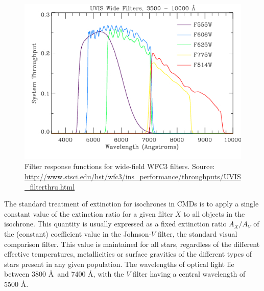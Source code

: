 \documentclass[12pt, a4paper]{report}
\begin{document}
\begin{figure}[h]
\begin{center}
\includegraphics[width=1.0\textwidth]{UVIS_Wide2.jpg}
\caption{Filter response functions for wide-field WFC3 filters. Source: \protect\url{http://www.stsci.edu/hst/wfc3/ins_performance/throughputs/UVIS_filterthru.html}}
\label{WFC3_response_funcs2}
\end{center}
\end{figure}

The standard treatment of extinction for isochrones in CMDs is to apply a single constant value of the extinction ratio for a given filter $X$ to all objects in the isochrone. This quantity is usually expressed as a fixed extinction ratio $A_{X}/A_{V}$ of the (constant) coefficient value in the Johnson-$V$ filter, the standard visual comparison filter. This value is maintained for all stars, regardless of the different effective temperatures, metallicities or surface gravities of the different types of stars present in any given population. The wavelengths of optical light lie between 3800 \AA\ and 7400 \AA, with the $V$ filter having a central wavelength of 5500 \AA.
\end{document}
